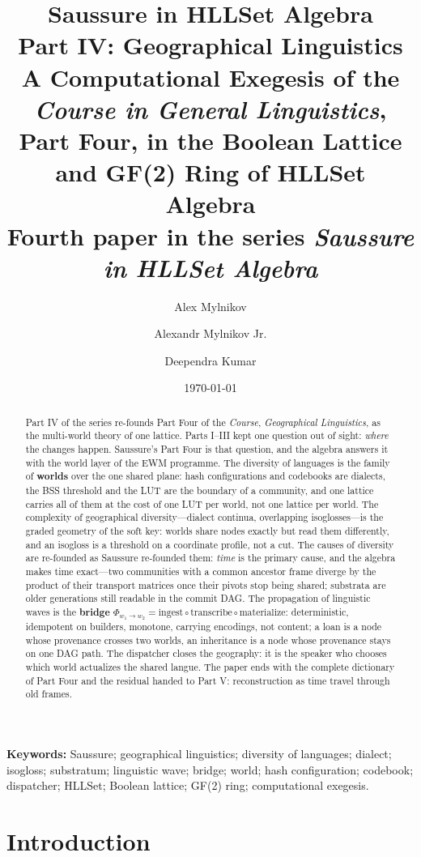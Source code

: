 \documentclass[11pt,a4paper]{article}
\title{\textbf{Saussure in HLLSet Algebra}\\[4pt]
\large Part IV: Geographical Linguistics\\[4pt]
\large A Computational Exegesis of the \textit{Course in General Linguistics},\\
Part Four, in the Boolean Lattice and GF(2) Ring of HLLSet Algebra\\[6pt]
\normalsize Fourth paper in the series \textit{Saussure in HLLSet Algebra}}
\author{Alex Mylnikov \and Alexandr Mylnikov Jr. \and Deependra Kumar}
\date{\today}
\theoremstyle{remark}
\newcommand{\Bridge}{\ensuremath{\Phi}}                  %
\begin{document}
\maketitle

\begin{abstract}
Part IV of the series re-founds Part Four of the \textit{Course},
\emph{Geographical Linguistics}, as the multi-world theory of one lattice.
Parts I--III kept one question out of sight: \emph{where} the changes happen.
Saussure's Part Four is that question, and the algebra answers it with the
world layer of the EWM programme. The diversity of languages is the family of
\textbf{worlds} over the one shared plane: hash configurations and codebooks
are dialects, the BSS threshold and the LUT are the boundary of a community,
and one lattice carries all of them at the cost of one LUT per world, not one
lattice per world. The complexity of geographical diversity---dialect
continua, overlapping isoglosses---is the graded geometry of the soft key:
worlds share nodes exactly but read them differently, and an isogloss is a
threshold on a coordinate profile, not a cut. The causes of diversity are
re-founded as Saussure re-founded them: \emph{time} is the primary cause, and
the algebra makes time exact---two communities with a common ancestor frame
diverge by the product of their transport matrices once their pivots stop
being shared; substrata are older generations still readable in the commit
DAG. The propagation of linguistic waves is the \textbf{bridge}
$\Bridge_{w_1\to w_2} = \text{ingest} \circ \text{transcribe} \circ
\text{materialize}$: deterministic, idempotent on builders, monotone, carrying
encodings, not content; a loan is a node whose provenance crosses two worlds,
an inheritance is a node whose provenance stays on one DAG path. The
dispatcher closes the geography: it is the speaker who chooses which world
actualizes the shared langue. The paper ends with the complete dictionary of
Part Four and the residual handed to Part V: reconstruction as time travel
through old frames.
\end{abstract}

\noindent\textbf{Keywords:} Saussure; geographical linguistics; diversity of
languages; dialect; isogloss; substratum; linguistic wave; bridge; world;
hash configuration; codebook; dispatcher; HLLSet; Boolean lattice; GF(2)
ring; computational exegesis.

\section{Introduction}
\label{sec:intro}
\end{document}
